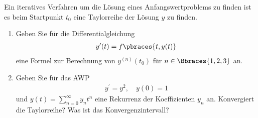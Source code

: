 \begin{exercise}
    Ein iteratives Verfahren um die Lösung eines Anfangswertproblems zu finden ist es beim Startpunkt $t_0$ eine Taylorreihe der Lösung $y$ zu finden.
    \begin{enumerate}[label = \alph*)]
        \item Geben Sie für die Differentialgleichung 
        \begin{align*}
            y^\prime(t) = f\pbraces{t,y(t)}
        \end{align*}
        eine Formel zur Berechnung von $y^{(n)}(t_0)$ für $n \in \Bbraces{1,2,3}$ an.

        \item Geben Sie für das AWP 
        \begin{align*}
            y^\prime = y^2, \quad y(0) = 1
        \end{align*}
        und $y(t) = \sum_{n = 0}^\infty y_n t^n$ eine Rekurrenz der Koeffizienten $y_n$ an. Konvergiert die Taylorreihe? Was ist das Konvergenzintervall? 
    \end{enumerate}
\end{exercise}

